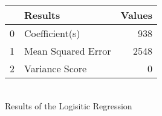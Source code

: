 \begin{tabular}{llr}
\toprule
{} &             Results &  Values \\
\midrule
0 &      Coefficient(s) &     938 \\
1 &  Mean Squared Error &    2548 \\
2 &      Variance Score &       0 \\
\bottomrule
\end{tabular}
\\\caption{Results of the Logisitic Regression}